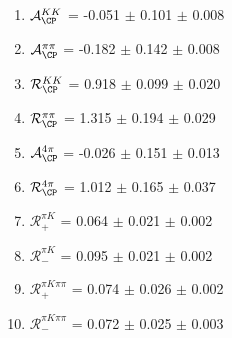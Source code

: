 \begin{enumerate}
\item $\mathcal{A}_{\CP}^{KK}$ = -0.051 $\pm$ 0.101 $\pm$ 0.008
\item $\mathcal{A}_{\CP}^{\pi\pi}$ = -0.182 $\pm$ 0.142 $\pm$ 0.008
\item $\mathcal{R}_{\CP}^{KK}$ = 0.918 $\pm$ 0.099 $\pm$ 0.020
\item $\mathcal{R}_{\CP}^{\pi\pi}$ = 1.315 $\pm$ 0.194 $\pm$ 0.029
\item $\mathcal{A}_{\CP}^{4\pi}$ = -0.026 $\pm$ 0.151 $\pm$ 0.013
\item $\mathcal{R}_{\CP}^{4\pi}$ = 1.012 $\pm$ 0.165 $\pm$ 0.037
\item $\mathcal{R}_+^{\pi K}$ = 0.064 $\pm$ 0.021 $\pm$ 0.002
\item $\mathcal{R}_-^{\pi K}$ = 0.095 $\pm$ 0.021 $\pm$ 0.002
\item $\mathcal{R}_+^{\pi K\pi\pi}$ = 0.074 $\pm$ 0.026 $\pm$ 0.002
\item $\mathcal{R}_-^{\pi K\pi\pi}$ = 0.072 $\pm$ 0.025 $\pm$ 0.003
\end{enumerate}
